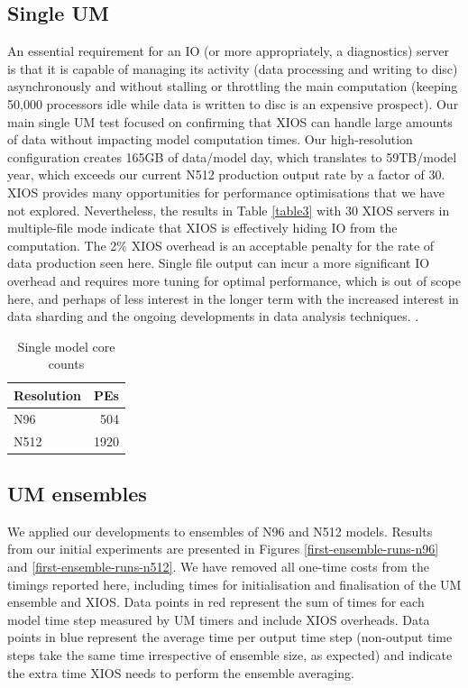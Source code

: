 \documentclass[twocolumn, 5p, times]{elsarticle}
\begin{document}
\subsection{Single UM}

An essential requirement for an IO (or more appropriately, a diagnostics) server is that it is capable of managing its activity (data processing and writing to disc) asynchronously and without stalling or throttling the main computation (keeping 50,000 processors idle while data is written to disc is an expensive prospect). Our main single UM test focused on confirming that XIOS can handle large amounts of data without impacting model computation times. Our high-resolution configuration creates 165GB of data/model day, which translates to 59TB/model year, which exceeds our current N512 production output rate by a factor of 30. XIOS provides many opportunities for performance optimisations that we have not explored. Nevertheless, the results in Table \ref{table3} with 30 XIOS servers in multiple-file mode indicate that XIOS is effectively hiding IO from the computation. The 2\% XIOS overhead is an acceptable penalty for the rate of data production seen here. Single file output can incur a more significant IO overhead and requires more tuning for optimal performance, which is out of scope here, and perhaps of less interest in the longer term with the increased interest in data sharding and the ongoing developments in data analysis techniques. \cite{NEEDED}.

\begin{table}
	\begin{center}
	\begin{tabular}{|l|r|}
		\hline
		Resolution & \multicolumn{1}{c|}{PEs} \\
		\hline
		N96 & 504\\
		N512 &1920 \\
		\hline
	\end{tabular}
	\caption{Single model core counts}
        \label{table1}
	\end{center}
\end{table}
 

\subsection{UM ensembles}

We applied our developments to ensembles of N96 and N512 models. Results from our initial experiments are presented in Figures \ref{first-ensemble-runs-n96} and \ref{first-ensemble-runs-n512}. We have removed all one-time costs from the timings reported here, including times for initialisation and finalisation of the UM ensemble and XIOS. Data points in red represent the sum of times for each model time step measured by UM timers and include XIOS overheads. Data points in blue represent the average time per output time step (non-output time steps take the same time irrespective of ensemble size, as expected) and indicate the extra time XIOS needs to perform the ensemble averaging.
\end{document}

